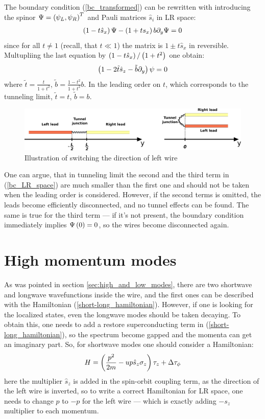 The boundary condition (\ref{bc_transformed}) can be rewritten with introducing the spinor $ \Psi=\left(\psi_L, \psi_R\right)^T $ and Pauli matrices $ \hat{s}_i $ in LR space:
\begin{gather}
	\left(1-t\hat{s}_x\right)\Psi-\left(1+t s_x\right)b\partial_y\Psi=0
\end{gather}
since for all $ t\ne 1 $ (recall, that $ t\ll1 $) the matrix is $ 1\pm t\hat{s}_x $ in reversible. Multupliing the last equation by $ \left(1-t\hat{s}_x\right)/\left(1+t^2\right) $ one obtain:
\begin{gather}
\label{bc_LR_space}
	\left(1-2\tilde{t}\hat{s}_z-\tilde{b}\partial_y\right)\psi=0
\end{gather}
where $ \tilde{t}=\frac{t}{1+t^2} $, $ \tilde{b} = \frac{1-t^2}{1+t^2}b $. In the leading order on $ t $, which corresponds to the tunneling limit, $ \tilde{t}=t $, $ \tilde{b} = b $.
\begin{figure}[H]
	\centering
	\includegraphics[width=0.9\linewidth]{images/bc_transform}
	\caption{Illustration of switching the direction of left wire}
	\label{fig:bctransform}
\end{figure}

One can argue, that in tunneling limit the second and the third term in (\ref{bc_LR_space}) are much smaller than the first one and should not be taken when the leading order is considered. However, if the second terms is omitted, the leads become efficiently disconnected, and no tunnel effects can be found. The same is true for the third term --- if it's not present, the boundary condition immediately implies $ \Psi\left(0\right) = 0 $, so the wires become disconnected again.

\section{High momentum modes}  

As was pointed in section \ref{sec:high_and_low_modes}, there are two  shortwave and longwave wavefunctions inside the wire, and the first ones can be described with the Hamiltonian (\ref{short-long_hamiltonian}). However, if one is looking for the localized states, even the longwave modes should be taken decaying. To obtain this, one needs to add a restore superconducting term in (\ref{short-long_hamiltonian}), so the spectrum become gapped and the momenta can get an imaginary part. So, for shortwave modes one should consider a Hamiltonian:
\begin{gather}
\label{high_mods_hamiltonian}
	H=\left(\frac{p^2}{2m}-up\hat{s}_z\sigma_z\right)\tau_z+\Delta\tau_\phi
\end{gather}
here the multiplier $ \hat{s}_z $ is added in the spin-orbit coupling term, as the direction of the left wire is inverted, so to write a correct Hamiltonian for LR space, one needs to change $ p $ to $ -p $ for the left wire --- which is exactly adding $ -s_z $ multiplier to each momentum.

